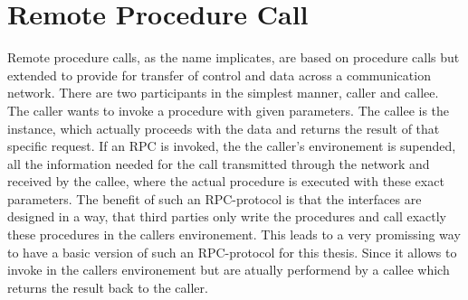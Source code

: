 \section{Remote Procedure Call}
Remote procedure calls, as the name implicates, are based on procedure calls but extended
to provide for transfer of control and data across a communication network. There are
two participants in the simplest manner, caller and callee. The caller wants to invoke a
procedure with given parameters. The callee is the instance, which actually proceeds with
the data and returns the result of that specific request. If an RPC is invoked, the the caller’s
environement is supended, all the information needed for the call transmitted through the
network and received by the callee, where the actual procedure is executed with these exact
parameters. The benefit of such an RPC-protocol is that the interfaces are designed in a
way, that third parties only write the procedures and call exactly these procedures in the
callers environement.\citet{birrell1984implementing} This leads to a very promissing way to have a basic version of such
an RPC-protocol for this thesis. Since it allows to invoke in the callers environement but
are atually performend by a callee which returns the result back to the caller.\citet{birrell1984implementing}
